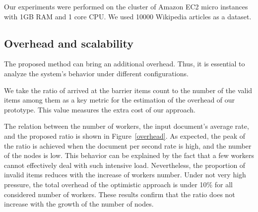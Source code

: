 Our experiments were performed on the cluster of Amazon EC2 micro instances with 1GB RAM and 1 core CPU. We used 10000 Wikipedia articles as a dataset. 

\subsection{Overhead and scalability}
The proposed method can bring an additional overhead. Thus, it is essential to analyze the system's behavior under different configurations.

We take the ratio of arrived at the barrier items count to the number of the valid items among them as a key metric for the estimation of the overhead of our prototype. This value measures the extra cost of our approach.

The relation between the number of workers, the input document's average rate, and the proposed ratio is shown in Figure~\ref{overhead}. As expected, the peak of the ratio is achieved when the document per second rate is high, and the number of the nodes is low. This behavior can be explained by the fact that a few workers cannot effectively deal with such intensive load. Nevertheless, the proportion of invalid items reduces with the increase of workers number. Under not very high pressure, the total overhead of the optimistic approach is under 10\% for all considered number of workers. These results confirm that the ratio does not increase with the growth of the number of nodes.

